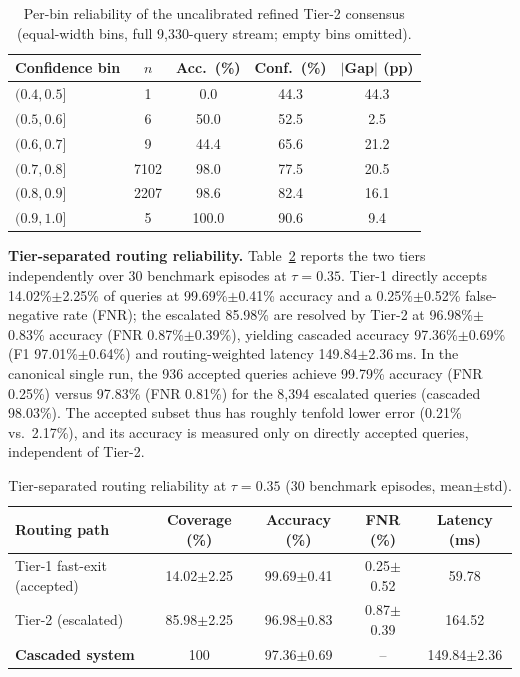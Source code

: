 \documentclass[preprint,12pt]{elsarticle}
\begin{document}
\begin{table}[htbp]
\caption{Per-bin reliability of the uncalibrated refined Tier-2 consensus (equal-width bins, full 9,330-query stream; empty bins omitted).}
\label{tab:reliability_bins}
\centering

\footnotesize
\begin{tabular}{lcccc}
\toprule
\textbf{Confidence bin} & \textbf{$n$} & \textbf{Acc.\ (\%)} & \textbf{Conf.\ (\%)} & \textbf{$|$Gap$|$ (pp)} \\
\midrule
$(0.4,0.5]$ & 1    & 0.0   & 44.3 & 44.3 \\
$(0.5,0.6]$ & 6    & 50.0  & 52.5 & 2.5 \\
$(0.6,0.7]$ & 9    & 44.4  & 65.6 & 21.2 \\
$(0.7,0.8]$ & 7102 & 98.0  & 77.5 & 20.5 \\
$(0.8,0.9]$ & 2207 & 98.6  & 82.4 & 16.1 \\
$(0.9,1.0]$ & 5    & 100.0 & 90.6 & 9.4 \\
\bottomrule
\end{tabular}
\end{table}

\textbf{Tier-separated routing reliability.} Table~\ref{tab:tier_routing} reports the two tiers independently over 30 benchmark episodes at $\tau=0.35$. Tier-1 directly accepts 14.02\%$\pm$2.25\% of queries at 99.69\%$\pm$0.41\% accuracy and a 0.25\%$\pm$0.52\% false-negative rate (FNR); the escalated 85.98\% are resolved by Tier-2 at 96.98\%$\pm$0.83\% accuracy (FNR 0.87\%$\pm$0.39\%), yielding cascaded accuracy 97.36\%$\pm$0.69\% (F1 97.01\%$\pm$0.64\%) and routing-weighted latency 149.84$\pm$2.36\,ms. In the canonical single run, the 936 accepted queries achieve 99.79\% accuracy (FNR 0.25\%) versus 97.83\% (FNR 0.81\%) for the 8,394 escalated queries (cascaded 98.03\%). The accepted subset thus has roughly tenfold lower error (0.21\% vs.\ 2.17\%), and its accuracy is measured only on directly accepted queries, independent of Tier-2.

\begin{table}[htbp]
\caption{Tier-separated routing reliability at $\tau=0.35$ (30 benchmark episodes, mean$\pm$std).}
\label{tab:tier_routing}
\centering

\footnotesize
\begin{tabularx}{\textwidth}{lcccc}
\toprule
\textbf{Routing path} & \textbf{Coverage (\%)} & \textbf{Accuracy (\%)} & \textbf{FNR (\%)} & \textbf{Latency (ms)} \\
\midrule
Tier-1 fast-exit (accepted) & 14.02$\pm$2.25 & 99.69$\pm$0.41 & 0.25$\pm$0.52 & 59.78 \\
Tier-2 (escalated) & 85.98$\pm$2.25 & 96.98$\pm$0.83 & 0.87$\pm$0.39 & 164.52 \\
\midrule
\textbf{Cascaded system} & 100 & 97.36$\pm$0.69 & -- & 149.84$\pm$2.36 \\
\bottomrule
\end{tabularx}
\end{table}
\end{document}
